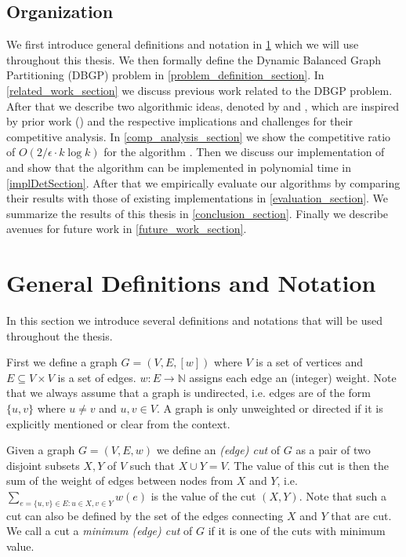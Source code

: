 \documentclass[a4paper, 10pt]{article}
\newcommand{\coreDel}{\text{C{\scriptsize REP}-C{\scriptsize ORE}}}
\newcommand{\adjDel}{\text{C{\scriptsize REP}-A{\scriptsize DJ}}}
\theoremstyle{definition}
\begin{document}
	\subsection{Organization}
	
	We first introduce general definitions and notation in \cref{gen_def_section} which we will use throughout this thesis. 
	We then formally define the Dynamic Balanced Graph Partitioning (DBGP) problem in \cref{problem_definition_section}. 
	In \cref{related_work_section} we discuss previous work related to the DBGP problem. After that we describe two algorithmic ideas, denoted by \adjDel{} and \coreDel{}, which are inspired by prior work (\cite{Avin2015, Avin2016}) and the respective implications and challenges for their competitive analysis. 
	In \cref{comp_analysis_section} we show the competitive ratio of $O(2/\epsilon\cdot k\log k)$ for the algorithm \adjDel{}.
	Then we discuss our implementation of \adjDel{} and show that the algorithm can be implemented in polynomial time in \cref{implDetSection}.
	After that we empirically evaluate our algorithms by comparing their results with those of existing implementations in \cref{evaluation_section}.
	We summarize the results of this thesis in \cref{conclusion_section}.
	Finally we describe avenues for future work in \cref{future_work_section}.
	
	
	
	\section{General Definitions and Notation}
	
	\label{gen_def_section}
	
	In this section we introduce several definitions and notations that will be used throughout the thesis.
	
	First we define a graph $G=(V, E, [w])$ where $V$ is a set of vertices and $E\subseteq V \times V$ is a set of edges. $w:E \rightarrow \mathbb{N}$ assigns each edge an (integer) weight. Note that we always assume that a graph is undirected, i.e. edges are of the form $\{u,v\}$ where $u\neq v$ and $u,v\in V$. A graph is only unweighted or directed if it is explicitly mentioned or clear from the context.
	
	Given a graph $G=(V,E,w)$ we define an \textit{(edge) cut} of $G$ as a pair of two disjoint subsets $X,Y$ of $V$ such that $X\cup Y=V$. The value of this cut is then the sum of the weight of edges between nodes from $X$ and $Y$, i.e. $\sum_{e=\{u,v\}\in E:u\in X, v\in Y}w(e)$ is the value of the cut $(X,Y)$. Note that such a cut can also be defined by the set of the edges connecting $X$ and $Y$ that are cut. We call a cut a \textit{minimum (edge) cut} of $G$ if it is one of the cuts with minimum value.
	
\end{document}
